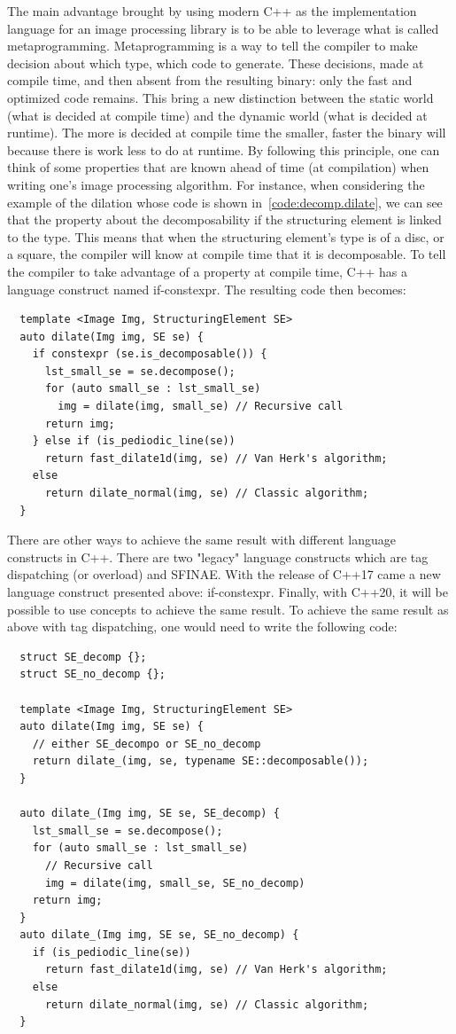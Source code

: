 The main advantage brought by using modern C++ as the implementation language for an image processing library is to be
able to leverage what is called metaprogramming. Metaprogramming is a way to tell the compiler to make decision about
which type, which code to generate. These decisions, made at compile time, and then absent from the resulting binary:
only the fast and optimized code remains. This bring a new distinction between the static world (what is decided at
compile time) and the dynamic world (what is decided at runtime). The more is decided at compile time the smaller,
faster the binary will because there is work less to do at runtime. By following this principle, one can think of some
properties that are known ahead of time (at compilation) when writing one's image processing algorithm. For instance,
when considering the example of the dilation whose code is shown in~\ref{code:decomp.dilate}, we can see that the
property about the decomposability if the structuring element is linked to the type. This means that when the
structuring element's type is of a disc, or a square, the compiler will know at compile time that it is decomposable. To
tell the compiler to take advantage of a property at compile time, C++ has a language construct named if-constexpr. The
resulting code then becomes:

\begin{verbatim}
  template <Image Img, StructuringElement SE>
  auto dilate(Img img, SE se) {
    if constexpr (se.is_decomposable()) {
      lst_small_se = se.decompose();
      for (auto small_se : lst_small_se)
        img = dilate(img, small_se) // Recursive call
      return img;
    } else if (is_pediodic_line(se))
      return fast_dilate1d(img, se) // Van Herk's algorithm;
    else
      return dilate_normal(img, se) // Classic algorithm;
  }
\end{verbatim}

There are other ways to achieve the same result with different language constructs in C++. There are two "legacy"
language constructs which are tag dispatching (or overload) and SFINAE. With the release of C++17 came a new language
construct presented above: if-constexpr. Finally, with C++20, it will be possible to use concepts to achieve the same
result. To achieve the same result as above with tag dispatching, one would need to write the following code:

\begin{verbatim}
  struct SE_decomp {};
  struct SE_no_decomp {};

  template <Image Img, StructuringElement SE>
  auto dilate(Img img, SE se) {
    // either SE_decompo or SE_no_decomp
    return dilate_(img, se, typename SE::decomposable());
  }

  auto dilate_(Img img, SE se, SE_decomp) {
    lst_small_se = se.decompose();
    for (auto small_se : lst_small_se)
      // Recursive call
      img = dilate(img, small_se, SE_no_decomp)
    return img;
  }
  auto dilate_(Img img, SE se, SE_no_decomp) {
    if (is_pediodic_line(se))
      return fast_dilate1d(img, se) // Van Herk's algorithm;
    else
      return dilate_normal(img, se) // Classic algorithm;
  }
\end{verbatim}

